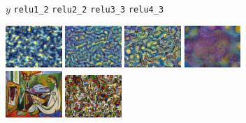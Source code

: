 \documentclass[runningheads]{llncs}
\begin{document}
\begin{figure}[t]
  \hspace{11mm} $y$
  \hspace{15mm} \verb|relu1_2|
  \hspace{10mm} \verb|relu2_2|
  \hspace{10mm} \verb|relu3_3|
  \hspace{10mm} \verb|relu4_3|
  \vspace{-2.5mm}
  \begin{center}
    \includegraphics[width=0.19\textwidth]{starry_night_4.jpg}
    \includegraphics[width=0.19\textwidth]{starry_night_9.jpg}
    \includegraphics[width=0.19\textwidth]{starry_night_16.jpg}
    \includegraphics[width=0.19\textwidth]{starry_night_23.jpg} \\
    \includegraphics[width=0.19\textwidth]{la_muse_small.jpg}
    \includegraphics[width=0.19\textwidth]{la_muse_4.jpg}

\end{center}
\end{figure}
\end{document}
